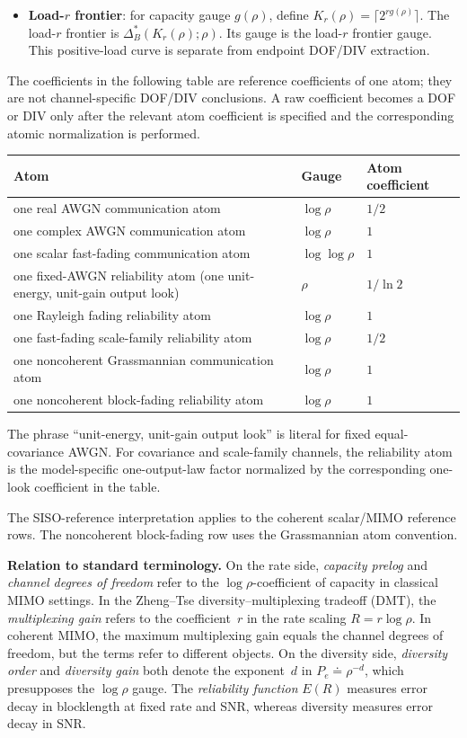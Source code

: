 \documentclass[lettersize,onecolumn]{IEEEtran}
\newcommand{\snr}{\rho}
\begin{document}
\begin{itemize}
\item \textbf{Load-$r$ frontier}: for capacity gauge
$g(\snr)$, define $K_r(\snr)=\lceil 2^{r g(\snr)}\rceil$.
The load-$r$ frontier is $\Delta_B^*(K_r(\snr);\snr)$. Its gauge is
the load-$r$ frontier gauge. This positive-load curve is separate
from endpoint DOF/DIV extraction.

\end{itemize}

The coefficients in the following table are reference coefficients of
one atom; they are not channel-specific DOF/DIV conclusions.
A raw coefficient becomes a DOF or DIV only after the relevant atom
coefficient is specified and the corresponding atomic normalization is
performed.

\begin{center}
\small
\begin{tabular}{@{}lll@{}}
\toprule
Atom & Gauge & Atom coefficient \\
\midrule
one real AWGN communication atom & $\log\snr$ & $1/2$ \\
one complex AWGN communication atom & $\log\snr$ & $1$ \\
one scalar fast-fading communication atom & $\log\log\snr$ & $1$ \\
one fixed-AWGN reliability atom (one unit-energy, unit-gain output look) & $\snr$ & $1/\ln 2$ \\
one Rayleigh fading reliability atom & $\log\snr$ & $1$ \\
one fast-fading scale-family reliability atom & $\log\snr$ & $1/2$ \\
one noncoherent Grassmannian communication atom & $\log\snr$ & $1$ \\
one noncoherent block-fading reliability atom & $\log\snr$ & $1$ \\
\bottomrule
\end{tabular}
\end{center}

The phrase ``unit-energy, unit-gain output look'' is literal for
fixed equal-covariance AWGN\@. For covariance and scale-family
channels, the reliability atom is the model-specific one-output-law
factor normalized by the corresponding one-look coefficient in the
table.

The SISO-reference interpretation applies to the coherent scalar/MIMO
reference rows. The noncoherent block-fading row uses the
Grassmannian atom convention.

\textbf{Relation to standard terminology.}
On the rate side, \emph{capacity prelog} and \emph{channel degrees of
freedom} refer to the $\log\snr$-coefficient of capacity in classical
MIMO settings. In the Zheng--Tse diversity--multiplexing tradeoff
(DMT), the \emph{multiplexing gain} refers to the coefficient~$r$ in
the rate scaling $R = r\log\snr$. In coherent
MIMO, the maximum multiplexing gain equals the channel degrees of
freedom, but the terms refer to different objects. On the diversity
side, \emph{diversity order} and \emph{diversity gain} both denote
the exponent~$d$ in $P_e \doteq \snr^{-d}$, which presupposes the
$\log\snr$ gauge. The \emph{reliability function} $E(R)$ measures
error decay in blocklength at fixed rate and SNR, whereas diversity
measures error decay in SNR.
\end{document}
